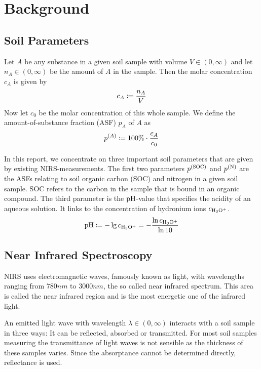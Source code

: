 \section{Background}
\label{sec:background}
	
	\subsection{Soil Parameters}
	\label{ssec:soil-parameters}
	
		Let $A$ be any substance in a given soil sample with volume $V\in(0,\infty)$ and let $n_A\in(0,\infty)$ be the amount of $A$ in the sample.
		Then the molar concentration $c_A$ is given by
		\[
			c_A \coloneqq \frac{n_A}{V}
		\]
		Now let $c_0$ be the molar concentration of this whole sample.
		We define the amount-of-substance fraction (ASF) $p_A$ of $A$ as 
		\[
			p^{(A)} \coloneqq 100\%\cdot\frac{c_A}{c_0}
		\]

		In this report, we concentrate on three important soil parameters that are given by existing NIRS-measurements. %
		The first two parameters $p^{\mathrm{(SOC)}}$ and $p^{\mathrm{(N)}}$ are the ASFs relating to soil organic carbon (SOC) and nitrogen in a given soil sample.
		SOC refers to the carbon in the sample that is bound in an organic compound.
		The third parameter is the $\mathrm{pH}$-value that specifies the acidity of an aqueous solution.
		It links to the concentration of hydronium ions $c_{\mathrm{H_3O^+}}$.
		\[
			\mathrm{pH} \coloneqq -\lg c_{\mathrm{H_3O^+}} = -\frac{\ln c_{\mathrm{H_3O^+}}}{\ln 10}
		\]
	

	\subsection{Near Infrared Spectroscopy}
	\label{ssec:nirs}
	
		NIRS uses electromagnetic waves,%
		 famously known as light, with wavelengths ranging from $780\unit{nm}$ to $3000\unit{nm}$, the so called near infrared spectrum.
		This area is called the near infrared region and is the most energetic one of the infrared light.

		An emitted light wave with wavelength $\lambda \in (0,\infty)$ interacts with a soil sample in three ways:
		It can be reflected, absorbed or transmitted.
		For most soil samples measuring the transmittance of light waves is not sensible as the thickness of these samples varies.
		Since the absorptance cannot be determined directly, reflectance is used.

